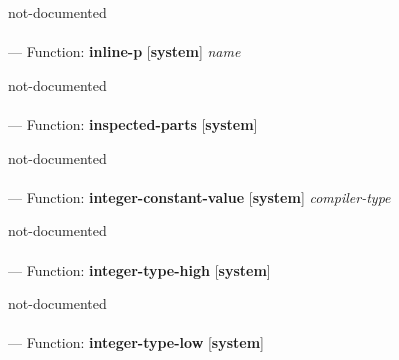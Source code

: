 \begin{adjustwidth}{5em}{5em}
not-documented
\end{adjustwidth}

\paragraph{}
\label{SYSTEM:INLINE-P}
--- Function: \textbf{inline-p} [\textbf{system}] \textit{name}

\begin{adjustwidth}{5em}{5em}
not-documented
\end{adjustwidth}

\paragraph{}
\label{SYSTEM:INSPECTED-PARTS}
--- Function: \textbf{inspected-parts} [\textbf{system}] \textit{}

\begin{adjustwidth}{5em}{5em}
not-documented
\end{adjustwidth}

\paragraph{}
\label{SYSTEM:INTEGER-CONSTANT-VALUE}
--- Function: \textbf{integer-constant-value} [\textbf{system}] \textit{compiler-type}

\begin{adjustwidth}{5em}{5em}
not-documented
\end{adjustwidth}

\paragraph{}
\label{SYSTEM:INTEGER-TYPE-HIGH}
--- Function: \textbf{integer-type-high} [\textbf{system}] \textit{}

\begin{adjustwidth}{5em}{5em}
not-documented
\end{adjustwidth}

\paragraph{}
\label{SYSTEM:INTEGER-TYPE-LOW}
--- Function: \textbf{integer-type-low} [\textbf{system}] \textit{}

